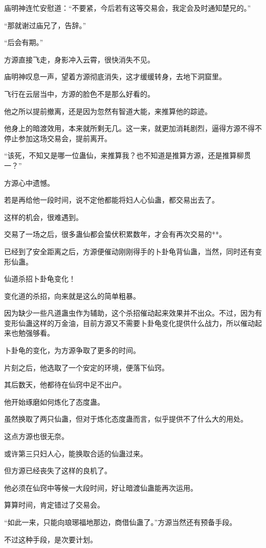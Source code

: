 \begin{this_body}
庙明神连忙安慰道：“不要紧，今后若有这等交易会，我定会及时通知楚兄的。”

“那就谢过庙兄了，告辞。”

“后会有期。”

方源直接飞走，身影冲入云霄，很快消失不见。

庙明神叹息一声，望着方源彻底消失，这才缓缓转身，去地下洞窟里。

飞行在云层当中，方源的脸色不是那么好看的。

他之所以提前撤离，还是因为忽然有智道大能，来推算他的踪迹。

他身上的暗渡效用，本来就所剩无几。这一来，就更加消耗剧烈，逼得方源不得不停止参加这场交易会，提前离开。

“该死，不知又是哪一位蛊仙，来推算我？也不知道是推算方源，还是推算柳贯一？”

方源心中遗憾。

若是再给他一段时间，说不定他都能将妇人心仙蛊，都交易出去了。

这样的机会，很难遇到。

交易了一场之后，很多蛊仙都会蛰伏积累数年，才会有再次交易的**。

已经到了安全距离之后，方源便催动刚刚得手的卜卦龟背仙蛊，当然，同时还有变形仙蛊。

仙道杀招卜卦龟变化！

变化道的杀招，向来就是这么的简单粗暴。

因为缺少一些凡道蛊虫作为辅助，这个杀招催动起来效果并不出众。不过，因为有变形仙蛊这样的万金油，目前方源又不需要卜卦龟变化提供什么战力，所以催动起来也勉强够看。

卜卦龟的变化，为方源争取了更多的时间。

片刻之后，他选取了一个安定的环境，便落下仙窍。

其后数天，他都待在仙窍中足不出户。

他开始琢磨如何炼化了态度蛊。

虽然换取了两只仙蛊，但对于炼化态度蛊而言，似乎提供不了什么大的用处。

这点方源也很无奈。

或许第三只妇人心，能换取合适的仙蛊过来。

但方源已经丧失了这样的良机了。

他必须在仙窍中等候一大段时间，好让暗渡仙蛊能再次运用。

算算时间，肯定错过了交易会。

“如此一来，只能向琅琊福地那边，商借仙蛊了。”方源当然还有预备手段。

不过这种手段，是次要计划。


\end{this_body}
